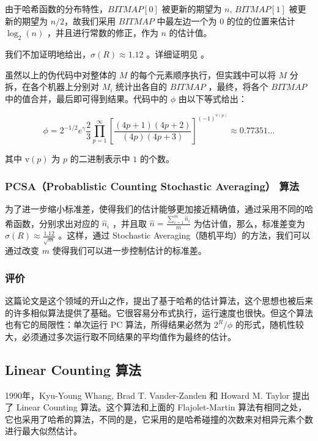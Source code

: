 \documentclass{ctexart}
\begin{document}
    由于哈希函数的分布特性，$BITMAP[0]$ 被更新的期望为 $n$, $BITMAP[1]$ 被更新的期望为 $n / 2$，故我们采用 $BITMAP$ 中最左边一个为 $0$ 的位的位置来估计 $\log_2(n)$ ，并且进行常数的修正，作为 $n$ 的估计值。

    我们不加证明地给出，$\sigma(R) \approx 1.12$ 。详细证明见 \cite{Flajolet:1985ixa} 。

    虽然以上的伪代码中对整体的 $M$ 的每个元素顺序执行，但实践中可以将 $M$ 分拆，在各个机器上分别对 $M_i$ 统计出各自的 $BITMAP$ ，最终，将各个 $BITMAP$ 中的值合并，最后即可得到结果。代码中的 $\phi$ 由以下等式给出：

    \begin{equation*}
        \phi = 2^{-1/2}e^{\gamma}\frac23\prod_{p=1}^{\infty}\left[\frac{(4p+1)(4p+2)}{(4p)(4p+3)}\right]^{(-1)^{\mathrm{v}(p)}} \approx 0.77351 \ldots
    \end{equation*}

    其中 $\mathrm{v}(p)$ 为 $p$ 的二进制表示中 $1$ 的个数。

\subsubsection{PCSA（Probablistic Counting Stochastic Averaging） 算法}

    为了进一步缩小标准差，使得我们的估计能够更加接近精确值，通过采用不同的哈希函数，分别求出对应的 $\hat{n}_i$ ，并且取 $\hat{n} = \frac{\sum_{i=1}^m{\hat{n}_i}}{m}$ 为估计值，那么，标准差变为 $\sigma(R) \approx \frac{1.12}{\sqrt{m}}$ 。这样，通过 Stochastic Averaging（随机平均）的方法，我们可以通过改变 $m$ 使得我们可以进一步控制估计的标准差。

\subsubsection{评价}
    这篇论文是这个领域的开山之作，提出了基于哈希的估计算法，这个思想也被后来的许多相似算法提供了基础。它很容易分布式执行，运行速度也很快。但这个算法也有它的局限性：单次运行 PC 算法，所得结果必然为 $2^R/\phi$ 的形式，随机性较大，必须通过多次运行取不同结果的平均值作为最终的估计。

\subsection{Linear Counting 算法 \cite{Whang:1990ei}}
    1990年，Kyu-Young Whang, Brad T. Vander-Zanden 和 Howard M. Taylor 提出了 Linear Counting 算法。这个算法和上面的 Flajolet-Martin 算法有相同之处，它也采用了哈希的算法，不同的是，它采用的是哈希碰撞的次数来对相异元素个数进行最大似然估计。
\end{document}
